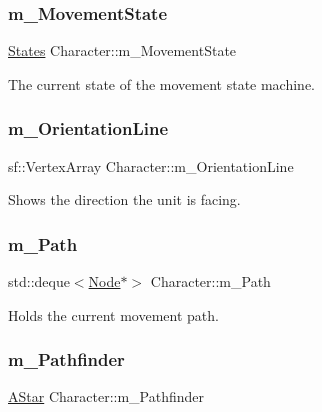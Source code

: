 \subsubsection{\texorpdfstring{m\+\_\+\+Movement\+State}{m\_MovementState}}
{\footnotesize\ttfamily \hyperlink{_character_8h_a808e5cd4979462d3bbe3070d7d147444}{States} Character\+::m\+\_\+\+Movement\+State\hspace{0.3cm}{\ttfamily [private]}}



The current state of the movement state machine. 

\mbox{\label{class_character_a9444b4e76eb7cfebfb6f13b5c6af5535}} 
\subsubsection{\texorpdfstring{m\+\_\+\+Orientation\+Line}{m\_OrientationLine}}
{\footnotesize\ttfamily sf\+::\+Vertex\+Array Character\+::m\+\_\+\+Orientation\+Line\hspace{0.3cm}{\ttfamily [private]}}



Shows the direction the unit is facing. 

\mbox{\label{class_character_a8aa67eb094307c8645c245e1c999cff8}} 
\subsubsection{\texorpdfstring{m\+\_\+\+Path}{m\_Path}}
{\footnotesize\ttfamily std\+::deque$<$\hyperlink{struct_node}{Node}$\ast$$>$ Character\+::m\+\_\+\+Path\hspace{0.3cm}{\ttfamily [private]}}



Holds the current movement path. 

\mbox{\label{class_character_a83fbc0831e0d59f349a3eab305d74965}} 
\subsubsection{\texorpdfstring{m\+\_\+\+Pathfinder}{m\_Pathfinder}}
{\footnotesize\ttfamily \hyperlink{class_a_star}{A\+Star} Character\+::m\+\_\+\+Pathfinder\hspace{0.3cm}{\ttfamily [private]}}



